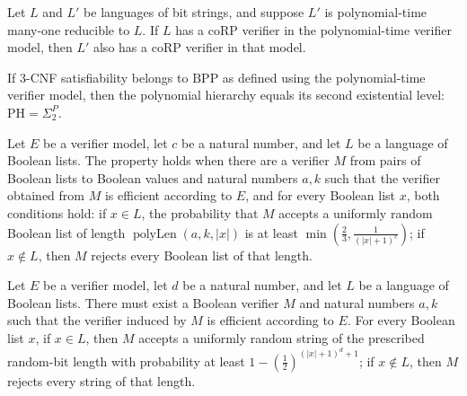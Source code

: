 \begin{theorem}
\label{Randomized.InCoRP.of_polyTimeReducible}
\leanok
{}
Let $L$ and $L'$ be languages of bit strings, and suppose $L'$ is polynomial-time
many-one reducible to $L$. If $L$ has a coRP verifier in the polynomial-time verifier
model, then $L'$ also has a coRP verifier in that model.
\end{theorem}

\begin{theorem}
\label{Randomized.PH_eq_SigmaP_two_of_inBPP_SAT3}
\leanok
{}
If $3$-CNF satisfiability belongs to $\mathrm{BPP}$ as defined using the polynomial-time
verifier model, then the polynomial hierarchy equals its second existential level:
$\mathrm{PH}=\Sigma_2^P$.
\end{theorem}

\begin{definition}
\label{Randomized.InRPWeak}
\leanok
{}
Let $E$ be a verifier model, let $c$ be a natural number, and let $L$ be a language of
Boolean lists. The property holds when there are a verifier $M$ from pairs of Boolean
lists to Boolean values and natural numbers $a,k$ such that the verifier obtained from
$M$ is efficient according to $E$, and for every Boolean list $x$, both conditions hold:
if $x\in L$, the probability that $M$ accepts a uniformly random Boolean list of length
$\operatorname{polyLen}(a,k,|x|)$ is at least
$\min\!\left(\frac23,\frac{1}{(|x|+1)^c}\right)$; if $x\notin L$, then $M$ rejects every
Boolean list of that length.
\end{definition}

\begin{definition}
\label{Randomized.InRPStrong}
\leanok
{}
Let $E$ be a verifier model, let $d$ be a natural number, and let $L$ be a language of
Boolean lists. There must exist a Boolean verifier $M$ and natural numbers $a,k$ such
that the verifier induced by $M$ is efficient according to $E$. For every Boolean list
$x$, if $x\in L$, then $M$ accepts a uniformly random string of the prescribed
random-bit length with probability at least $1-\left(\frac12\right)^{(|x|+1)^d+1}$; if
$x\notin L$, then $M$ rejects every string of that length.
\end{definition}

